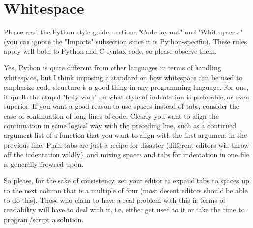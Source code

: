 \documentclass[12pt]{article}
\begin{document}
\section{Whitespace}
\label{sec:spacing}
Please read the \hyperref[pyguide]{Python style guide}, sections "Code lay-out" and "Whitespace\ldots" (you can ignore the "Imports" subsection since it is Python-specific). These rules apply well both to Python and C-syntax code, so please observe them.

Yes, Python is quite different from other languages in terms of handling whitespace, but I think imposing a standard on how whitespace can be used to emphasize code structure is a good thing in any programming language. For one, it quells the stupid "holy wars" on what style of indentation is preferable, or even superior. If you want a good reason to use spaces instead of tabs, consider the case of continuation of long lines of code. Clearly you want to align the continuation in some logical way with the preceding line, such as a continued argument list of a function that you want to align with the first argument in the previous line. Plain tabs are just a recipe for disaster (different editors will throw off the indentation wildly), and mixing spaces and tabs for indentation in one file is generally frowned upon.

So please, for the sake of consistency, set your editor to expand tabs to spaces up to the next column that is a multiple of four (most decent editors should be able to do this). Those who claim to have a real problem with this in terms of readability will have to deal with it, i.e. either get used to it or take the time to program/script a solution.
\end{document}
